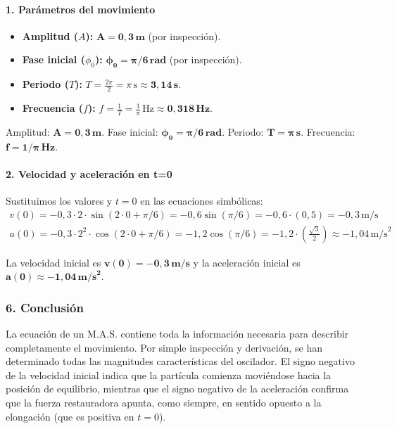 \paragraph{1. Parámetros del movimiento}
\begin{itemize}
    \item \textbf{Amplitud ($A$):} $\boldsymbol{A = 0,3 \, \textbf{m}}$ (por inspección).
    \item \textbf{Fase inicial ($\phi_0$):} $\boldsymbol{\phi_0 = \pi/6 \, \textbf{rad}}$ (por inspección).
    \item \textbf{Periodo ($T$):} $T = \frac{2\pi}{2} = \pi \, \text{s} \approx \boldsymbol{3,14 \, \textbf{s}}$.
    \item \textbf{Frecuencia ($f$):} $f = \frac{1}{T} = \frac{1}{\pi} \, \text{Hz} \approx \boldsymbol{0,318 \, \textbf{Hz}}$.
\end{itemize}
\begin{cajaresultado}
Amplitud: $\boldsymbol{A=0,3\,m}$. Fase inicial: $\boldsymbol{\phi_0=\pi/6\,rad}$. Periodo: $\boldsymbol{T=\pi\,s}$. Frecuencia: $\boldsymbol{f=1/\pi\,Hz}$.
\end{cajaresultado}

\paragraph{2. Velocidad y aceleración en t=0}
Sustituimos los valores y $t=0$ en las ecuaciones simbólicas:
\begin{gather}
    v(0) = -0,3 \cdot 2 \cdot \sin(2 \cdot 0 + \pi/6) = -0,6 \sin(\pi/6) = -0,6 \cdot (0,5) = -0,3 \, \text{m/s} \\
    a(0) = -0,3 \cdot 2^2 \cdot \cos(2 \cdot 0 + \pi/6) = -1,2 \cos(\pi/6) = -1,2 \cdot \left(\frac{\sqrt{3}}{2}\right) \approx -1,04 \, \text{m/s}^2
\end{gather}
\begin{cajaresultado}
La velocidad inicial es $\boldsymbol{v(0) = -0,3 \, \textbf{m/s}}$ y la aceleración inicial es $\boldsymbol{a(0) \approx -1,04 \, \textbf{m/s}^2}$.
\end{cajaresultado}

\subsubsection*{6. Conclusión}
\begin{cajaconclusion}
La ecuación de un M.A.S. contiene toda la información necesaria para describir completamente el movimiento. Por simple inspección y derivación, se han determinado todas las magnitudes características del oscilador. El signo negativo de la velocidad inicial indica que la partícula comienza moviéndose hacia la posición de equilibrio, mientras que el signo negativo de la aceleración confirma que la fuerza restauradora apunta, como siempre, en sentido opuesto a la elongación (que es positiva en $t=0$).
\end{cajaconclusion}

